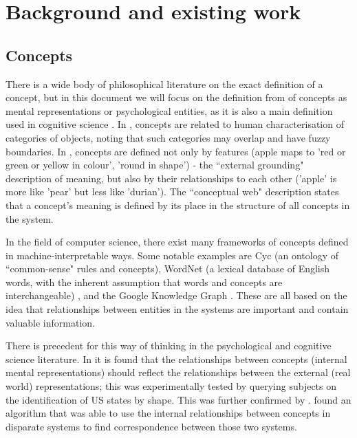 \chapter{Background and existing work}


\section{Concepts}

There is a wide body of philosophical literature on the exact definition of a concept, but in this document we will focus on the definition from \cite{stanfordconcepts} of concepts as mental representations or psychological entities, as it is also a main definition used in cognitive science \cite{Pinker2007}. In \cite{NatureOfHumanConcepts}, concepts are related to human characterisation of categories of objects, noting that such categories may overlap and have fuzzy boundaries. In \cite{GOLDSTONE2002295}, concepts are defined not only by features (apple maps to 'red or green or yellow in colour', 'round in shape') - the ``external grounding" description of meaning, but also by their relationships to each other ('apple' is more like 'pear' but less like 'durian'). The ``conceptual web" description states that a concept's meaning is defined by its place in the structure of all concepts in the system. 

In the field of computer science, there exist many frameworks of concepts defined in machine-interpretable ways. Some notable examples are Cyc \cite{Cyc} (an ontology of ``common-sense" rules and concepts), WordNet (a lexical database of English words, with the inherent assumption that words and concepts are interchangeable) \cite{WordNet}, and the Google Knowledge Graph \cite{KnowledgeGraphs}. These are all based on the idea that relationships between entities in the systems are important and contain valuable information. 

There is precedent for this way of thinking in the psychological and cognitive science literature. In \cite{SHEPARD19701} it is found that the relationships between concepts (internal mental representations) should reflect the relationships between the external (real world) representations; this was experimentally tested by querying subjects on the identification of US states by shape. This was further confirmed by \cite{SecondOrderIsomorphismFaces}. \cite{GOLDSTONE2002295} found an algorithm that was able to use the internal relationships between concepts in disparate systems to find correspondence between those two systems. 

